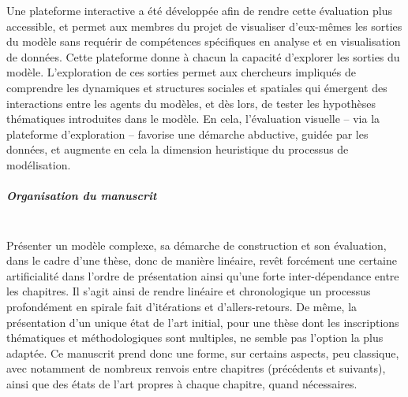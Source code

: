 Une plateforme interactive a été développée afin de rendre cette évaluation plus accessible, et permet aux membres du projet de visualiser d'eux-mêmes les sorties du modèle sans requérir de compétences spécifiques en analyse et en visualisation de données.
Cette plateforme donne à chacun la capacité d'explorer les sorties du modèle.
L'exploration de ces sorties permet aux chercheurs impliqués de comprendre les dynamiques et structures sociales et spatiales qui émergent des interactions entre les agents du modèles, et dès lors, de tester les hypothèses thématiques introduites dans le modèle.
En cela, l'évaluation visuelle -- via la plateforme d'exploration -- favorise une démarche abductive, guidée par les données, et augmente en cela la dimension heuristique du processus de modélisation.


\subparagraph{Organisation du manuscrit}~\\
Présenter un modèle complexe, sa démarche de construction et son évaluation, dans le cadre d'une thèse, donc de manière linéaire, revêt forcément une certaine artificialité dans l'ordre de présentation ainsi qu'une forte inter-dépendance entre les chapitres.
Il s'agit ainsi de rendre linéaire et chronologique un processus profondément \og en spirale\fg{} fait d'itérations et d'allers-retours.
De même, la présentation d'un unique état de l'art initial, pour une thèse dont les inscriptions thématiques et méthodologiques sont multiples, ne semble pas l'option la plus adaptée.
Ce manuscrit prend donc une forme, sur certains aspects, peu classique, avec notamment de nombreux renvois entre chapitres (précédents et suivants), ainsi que des états de l'art propres à chaque chapitre, quand nécessaires.

